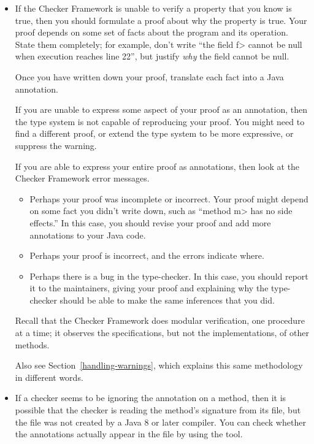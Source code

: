 \begin{itemize}
\item
  If the Checker Framework is unable to verify a property that you know is
  true, then you should formulate a proof about why the property is true.
  Your proof depends on some set of facts about the program and its
  operation.  State them completely; for example, don't write ``the field
  \<f> cannot be null when execution reaches line 22'', but justify
  \emph{why} the field cannot be null.

  Once you have written down your proof, translate each fact into a Java
  annotation.

  If you are unable to express some aspect of your proof as an annotation,
  then the type system is not capable of reproducing your proof.  You might
  need to find a different proof, or extend the type system to be more
  expressive, or suppress the warning.

  If you are able to express your entire proof as annotations, then look at
  the Checker Framework error messages.
  \begin{itemize}
  \item
    Perhaps your proof was incomplete or incorrect.  Your proof might
    depend on some fact you didn't write down, such as ``method
    \<m> has no side effects.''  In this case, you should revise your proof
    and add more annotations to your Java code.
  \item
    Perhaps your proof is incorrect, and the errors indicate where.
  \item
    Perhaps there is a bug in the type-checker.  In this case,
    you should report it to the maintainers, giving your proof and explaining
    why the type-checker should be able to make the same inferences that you did.
  \end{itemize}

  Recall that the Checker Framework does modular verification,
  one procedure at a time; it observes the specifications, but not the
  implementations, of other methods.

  Also see Section~\ref{handling-warnings}, which explains this same
  methodology in different words.

\item
If a checker seems to be ignoring the annotation on a method, then it is
possible that the checker is reading the method's signature from its
 file, but the  file was not created by a Java 8
or later compiler.
You can check whether the annotations actually appear in the
 file by using the  tool.


\end{itemize}
